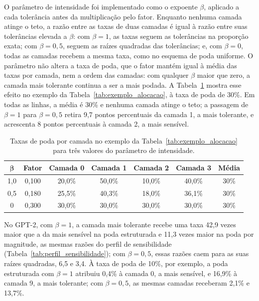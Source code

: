 O parâmetro de intensidade foi implementado como o expoente $\beta$, aplicado a cada
tolerância antes da multiplicação pelo fator. Enquanto nenhuma camada atinge o teto, a razão
entre as taxas de duas camadas é igual à razão entre suas tolerâncias elevada a $\beta$: com
$\beta = 1$, as taxas seguem as tolerâncias na proporção exata; com $\beta = 0{,}5$, seguem
as raízes quadradas das tolerâncias; e, com $\beta = 0$, todas as camadas recebem a mesma
taxa, como no esquema de poda uniforme. O parâmetro não altera a taxa de poda, que o fator
mantém igual à média das taxas por camada, nem a ordem das camadas: com qualquer $\beta$
maior que zero, a camada mais tolerante continua a ser a mais podada. A
Tabela~\ref{tab:exemplo_beta} mostra esse efeito no exemplo da
Tabela~\ref{tab:exemplo_alocacao}, à taxa de poda de 30\%. Em todas as linhas, a média é
30\% e nenhuma camada atinge o teto; a passagem de $\beta = 1$ para $\beta = 0{,}5$ retira
9,7 pontos percentuais da camada 1, a mais tolerante, e acrescenta 8 pontos percentuais à
camada 2, a mais sensível.

\begin{table}[htb]
\centering
\caption{Taxas de poda por camada no exemplo da Tabela~\ref{tab:exemplo_alocacao} para três
valores do parâmetro de intensidade.}
\label{tab:exemplo_beta}
\small
\begin{tabular}{cc ccccc}
\hline
$\boldsymbol{\beta}$ & \textbf{Fator} & \textbf{Camada 0} & \textbf{Camada 1} &
\textbf{Camada 2} & \textbf{Camada 3} & \textbf{Média} \\
\hline
1,0 & 0,100 & 20,0\% & 50,0\% & 10,0\% & 40,0\% & 30\% \\
0,5 & 0,180 & 25,5\% & 40,3\% & 18,0\% & 36,1\% & 30\% \\
0   & 0,300 & 30,0\% & 30,0\% & 30,0\% & 30,0\% & 30\% \\
\hline
\end{tabular}
\end{table}

No GPT-2, com $\beta = 1$, a camada mais tolerante recebe uma taxa 42,9 vezes maior que a da
mais sensível na poda estruturada e 11,3 vezes maior na poda por magnitude, as mesmas razões
do perfil de sensibilidade (Tabela~\ref{tab:perfil_sensibilidade}); com $\beta = 0{,}5$,
essas razões caem para as suas raízes quadradas, 6,5 e 3,4. À taxa de poda de 10\%, por
exemplo, a poda estruturada com $\beta = 1$ atribuiu 0,4\% à camada 0, a mais sensível, e
16,9\% à camada 9, a mais tolerante; com $\beta = 0{,}5$, as mesmas camadas receberam 2,1\%
e 13,7\%.

